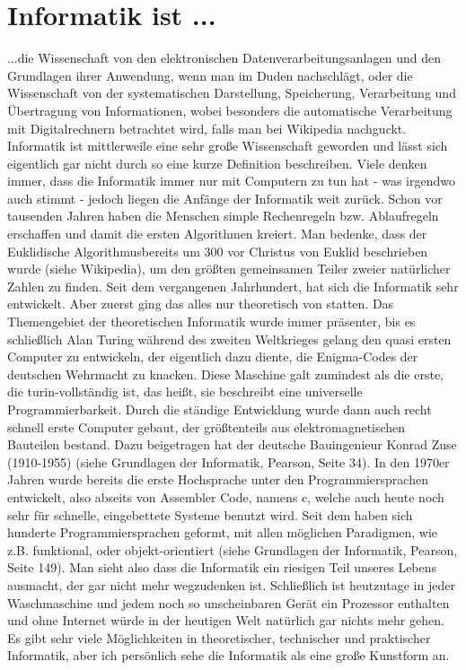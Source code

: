 \documentclass[12pt]{scrartcl}
\begin{document}
\section{Informatik ist ...}
...die Wissenschaft von den elektronischen Datenverarbeitungsanlagen und den Grundlagen ihrer Anwendung, wenn man im Duden nachschlägt, oder die Wissenschaft von der systematischen Darstellung, Speicherung, Verarbeitung und Übertragung von Informationen, wobei besonders die automatische Verarbeitung mit Digitalrechnern betrachtet wird, falls man bei Wikipedia nachguckt.
\newline
\newline
Informatik ist mittlerweile eine sehr große Wissenschaft geworden und lässt sich eigentlich gar nicht durch so eine kurze Definition beschreiben. Viele denken immer, dass die Informatik immer nur mit Computern zu tun hat - was irgendwo auch stimmt - jedoch liegen die Anfänge der Informatik weit zurück. Schon vor tausenden Jahren haben die Menschen simple Rechenregeln bzw. Ablaufregeln erschaffen und damit die ersten Algorithmen kreiert. Man bedenke, dass der \glqq Euklidische Algorithmus\grqq  bereits um 300 vor Christus von Euklid beschrieben wurde (siehe Wikipedia), um den größten gemeinsamen Teiler zweier natürlicher Zahlen zu finden.
\newline
\newline
Seit dem vergangenen Jahrhundert, hat sich die Informatik sehr entwickelt. Aber zuerst ging das alles nur theoretisch von statten. Das Themengebiet der theoretischen Informatik wurde immer präsenter, bis es schließlich Alan Turing während des zweiten Weltkrieges gelang den quasi ersten Computer zu entwickeln, der eigentlich dazu diente, die Enigma-Codes der deutschen Wehrmacht zu knacken. Diese Maschine galt zumindest als die erste, die turin-vollständig ist, das heißt, sie beschreibt eine universelle Programmierbarkeit.
\newline
Durch die ständige Entwicklung wurde dann auch recht schnell erste Computer gebaut, der größtenteils aus elektromagnetischen Bauteilen bestand. Dazu beigetragen hat der deutsche Bauingenieur Konrad Zuse (1910-1955) (siehe \glqq Grundlagen der Informatik\grqq  , Pearson, Seite 34).
\newline
In den 1970er Jahren wurde bereits die erste Hochsprache unter den Programmiersprachen entwickelt, also abseits von Assembler Code, namens \glqq c\grqq , welche auch heute noch sehr für schnelle, eingebettete Systeme benutzt wird. Seit dem haben sich hunderte Programmiersprachen geformt, mit allen möglichen Paradigmen, wie z.B. funktional, oder objekt-orientiert (siehe \glqq Grundlagen der Informatik\grqq  , Pearson, Seite 149).
\newline
\newline
Man sieht also dass die Informatik ein riesigen Teil unseres Lebens ausmacht, der gar nicht mehr wegzudenken ist. Schließlich ist heutzutage in jeder Waschmaschine und jedem noch so unscheinbaren Gerät ein Prozessor enthalten und ohne Internet würde in der heutigen Welt natürlich gar nichts mehr gehen.
\newline
Es gibt sehr viele Möglichkeiten in theoretischer, technischer und praktischer Informatik, aber ich persönlich sehe die Informatik als eine große Kunstform an.
\end{document}
